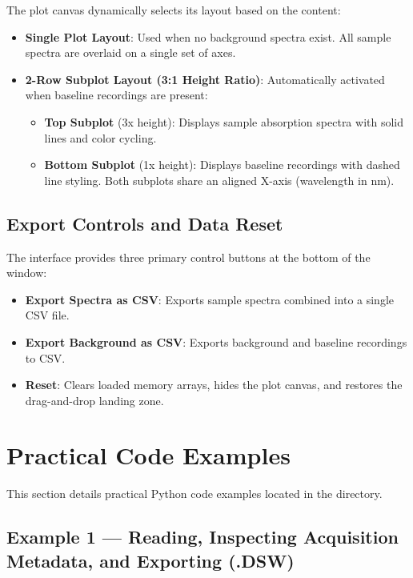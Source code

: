 \documentclass[11pt,a4paper]{article}
\newcommand{\code}[1]{\texttt{\detokenize{#1}}}
\begin{document}
The plot canvas dynamically selects its layout based on the content:
\begin{itemize}
  \item \textbf{Single Plot Layout}: Used when no background spectra exist. All sample spectra are overlaid on a single set of axes.
  \item \textbf{2-Row Subplot Layout (3:1 Height Ratio)}: Automatically activated when baseline recordings are present:
    \begin{itemize}
      \item \textbf{Top Subplot} (3x height): Displays sample absorption spectra with solid lines and color cycling.
      \item \textbf{Bottom Subplot} (1x height): Displays baseline recordings with dashed line styling. Both subplots share an aligned X-axis (wavelength in nm).
    \end{itemize}
\end{itemize}

\subsection{Export Controls and Data Reset}

The interface provides three primary control buttons at the bottom of the window:
\begin{itemize}
  \item \textbf{Export Spectra as CSV}: Exports sample spectra combined into a single CSV file.
  \item \textbf{Export Background as CSV}: Exports background and baseline recordings to CSV.
  \item \textbf{Reset}: Clears loaded memory arrays, hides the plot canvas, and restores the drag-and-drop landing zone.
\end{itemize}

\newpage
\section{Practical Code Examples}\label{sec:examples}

This section details practical Python code examples located in the \code{examples/} directory.

\subsection{Example 1 — Reading, Inspecting Acquisition Metadata, and Exporting (.DSW)}
\end{document}
